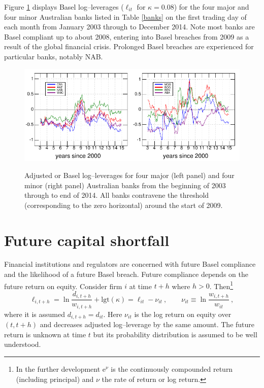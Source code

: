 \documentclass[12pt]{article}
\newcommand{\logit}{\mathrm{lgt}}
\newcommand{\e}{\mathrm{e}}
\newcommand{\fref}[1]{Figure \ref{#1}}
\newcommand{\tref}[1]{Table \ref{#1}}
\newcommand{\cq}{\ , \qquad}
\begin{document}
\fref{Bloglev} displays Basel log--leverages ($\ell_{it}$ for $\kappa=0.08$) for the four major and four minor Australian banks listed in \tref{banks} on the first trading day of each month from January 2003  through to December 2014.  Note most banks are Basel compliant up to about 2008, entering into Basel breaches from 2009 as a result of the global financial crisis. Prolonged Basel breaches are experienced for particular banks, notably NAB.


\begin{figure}[htbp]
\begin{center}
\label{Bloglev}
\includegraphics{figures/bloglev.pdf}
\caption{Adjusted or Basel log--leverages for four major (left panel) and four minor (right panel) Australian banks from the beginning of 2003 through to end of 2014.  All banks contravene the threshold (corresponding to the zero horizontal) around the start of 2009.}
\end{center}
\end{figure}


\section{Future capital shortfall}\label{futshort}

Financial institutions and regulators are concerned with future Basel compliance and the likelihood of a  future Basel breach.   Future compliance depends on the future return on equity.   Consider  firm $i$ at time  $t+h$ where $h>0$.  Then\footnote{In the further development $\e^\nu$ is the continuously compounded return (including principal) and $\nu$  the  rate of return or log return.}
$$
\ell_{i,t+h} = \ln \frac{d_{i,t+h}}{w_{i,t+h}} +\logit(\kappa)= \ell_{it} -\nu_{it}\cq \nu_{it}\equiv \ln\frac{w_{i,t+h}}{w_{it}}  \ ,
$$
where it is assumed $d_{i,t+h}=d_{it}$.  Here $\nu_{it}$ is the log return on equity over $(t,t+h)$ and decreases adjusted log--leverage by the same amount.  The future return is unknown at time $t$ but its probability distribution is assumed to be well understood.
\end{document}
